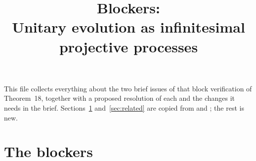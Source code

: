 \documentclass[11pt]{article}
\title{Blockers:\\ Unitary evolution as infinitesimal projective processes}
\author{}
\date{}
\begin{document}
\maketitle

\noindent
This file collects everything about the two brief issues of  that block
verification of Theorem~18, together with a proposed resolution of each and the changes it
needs in the brief. Sections~\ref{sec:blockers} and~\ref{sec:related} are copied from
 and ; the rest is new.

\section{The blockers}\label{sec:blockers}
\end{document}
